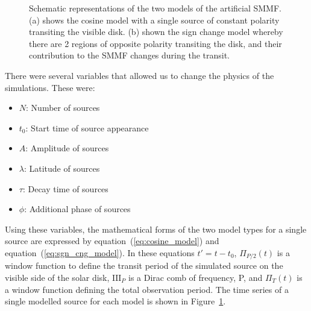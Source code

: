 \begin{figure}
	\centering
	\qquad
	\caption{Schematic representations of the two models of the artificial SMMF. (a) shows the cosine model with a single source of constant polarity transiting the visible disk. (b) shown the sign change model whereby there are 2 regions of opposite polarity transiting the disk, and their contribution to the SMMF changes during the transit.}  \label{fig:artificial_models}
\end{figure}


There were several variables that allowed us to change the physics of the simulations. These were:

\begin{itemize}
	\item{{\bf $N$}: Number of sources}
	\item{{\bf $t_0$}: Start time of source appearance}
	\item{{\bf $A$}: Amplitude of sources}
	\item{{\bf $\lambda$}: Latitude of sources}
	\item{{\bf $\tau$}: Decay time of sources}
	\item{{\bf $\phi$}: Additional phase of sources}
\end{itemize}

Using these variables, the mathematical forms of the two model types for a single source are expressed by equation~(\ref{eq:cosine_model}) and equation~(\ref{eq:sgn_cng_model}). In these equations $t' = t - t_0$, $\Pi_{P/2}(t)$ is a window function to define the transit period of the simulated source on the visible side of the solar disk, $\mathrm{III}_{P}$ is a Dirac comb of frequency, P, and $\Pi_{T}(t)$ is a window function defining the total observation period. The time series of a single modelled source for each model is shown in Figure~\ref{fig:artificial_models}.

